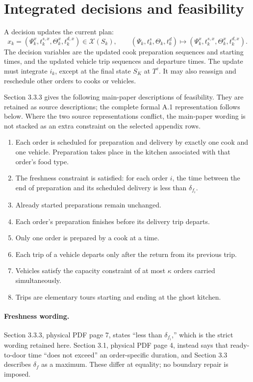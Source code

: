 \documentclass{article}
\begin{document}
\section*{Integrated decisions and feasibility}

A decision updates the current plan:
\[
x_k=(\Psi^x_k,t^{s,x}_k,\Theta^x_k,t^{d,x}_k)
\in\mathcal{X}(S_k),
\qquad
(\Psi_k,t^s_k,\Theta_k,t^d_k)
\longmapsto
(\Psi^x_k,t^{s,x}_k,\Theta^x_k,t^{d,x}_k).
\]
The decision variables are the updated cook preparation sequences and starting times, and the updated vehicle trip sequences and departure times. The update must integrate \(i_k\), except at the final state \(S_K\) at \(T^c\). It may also reassign and reschedule other orders to cooks or vehicles.

Section 3.3.3 gives the following main-paper descriptions of feasibility. They are retained as source descriptions; the complete formal A.1 representation follows below. Where the two source representations conflict, the main-paper wording is not stacked as an extra constraint on the selected appendix rows.
\begin{enumerate}
\item Each order is scheduled for preparation and delivery by exactly one cook and one vehicle. Preparation takes place in the kitchen associated with that order's food type.
\item The freshness constraint is satisfied: for each order \(i\), the time between the end of preparation and its scheduled delivery is less than \(\delta_{f_i}\).
\item Already started preparations remain unchanged.
\item Each order's preparation finishes before its delivery trip departs.
\item Only one order is prepared by a cook at a time.
\item Each trip of a vehicle departs only after the return from its previous trip.
\item Vehicles satisfy the capacity constraint of at most \(\kappa\) orders carried simultaneously.
\item Trips are elementary tours starting and ending at the ghost kitchen.
\end{enumerate}

\paragraph{Freshness wording.}
Section 3.3.3, physical PDF page 7, states ``less than \(\delta_{f_i}\),'' which is the strict wording retained here. Section 3.1, physical PDF page 4, instead says that ready-to-door time ``does not exceed'' an order-specific duration, and Section 3.3 describes \(\delta_f\) as a maximum. These differ at equality; no boundary repair is imposed.
\end{document}
